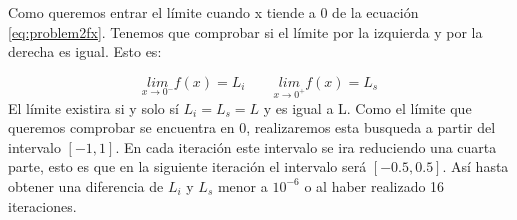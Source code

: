 Como queremos entrar el límite cuando x tiende a 0 de la ecuación \ref{eq:problem2fx}. Tenemos que comprobar si el límite por la izquierda y por la derecha es igual. Esto es:

\begin{equation*}
    \underset{x\rightarrow 0^-}{lim} f(x) = L_i
    \qquad
    \underset{x\rightarrow 0^+}{lim} f(x) = L_s
\end{equation*}
El límite existira si y solo sí $L_i=L_s=L$ y es igual a L. Como el límite que queremos comprobar se encuentra en 0, realizaremos esta busqueda a partir del intervalo $[-1,1]$. En cada iteración este intervalo se ira reduciendo una cuarta parte, esto es que en la siguiente iteración el intervalo será $[-0.5,0.5]$. Así hasta obtener una diferencia de $L_i$ y $L_s$ menor a $10^{-6}$ o al haber realizado 16 iteraciones.

